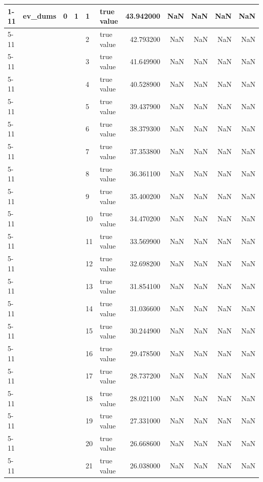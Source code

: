 \begin{tabular}{llllllrrrrr}
\cline{1-11} \cline{2-11} \cline{3-11} \cline{4-11} \cline{5-11}
\multirow[t]{202}{*}{ev} & \multirow[t]{202}{*}{ev_dums} & \multirow[t]{101}{*}{0} & \multirow[t]{25}{*}{1} & 1 & true value & 43.942000 & NaN & NaN & NaN & NaN \\
\cline{5-11}
 &  &  &  & 2 & true value & 42.793200 & NaN & NaN & NaN & NaN \\
\cline{5-11}
 &  &  &  & 3 & true value & 41.649900 & NaN & NaN & NaN & NaN \\
\cline{5-11}
 &  &  &  & 4 & true value & 40.528900 & NaN & NaN & NaN & NaN \\
\cline{5-11}
 &  &  &  & 5 & true value & 39.437900 & NaN & NaN & NaN & NaN \\
\cline{5-11}
 &  &  &  & 6 & true value & 38.379300 & NaN & NaN & NaN & NaN \\
\cline{5-11}
 &  &  &  & 7 & true value & 37.353800 & NaN & NaN & NaN & NaN \\
\cline{5-11}
 &  &  &  & 8 & true value & 36.361100 & NaN & NaN & NaN & NaN \\
\cline{5-11}
 &  &  &  & 9 & true value & 35.400200 & NaN & NaN & NaN & NaN \\
\cline{5-11}
 &  &  &  & 10 & true value & 34.470200 & NaN & NaN & NaN & NaN \\
\cline{5-11}
 &  &  &  & 11 & true value & 33.569900 & NaN & NaN & NaN & NaN \\
\cline{5-11}
 &  &  &  & 12 & true value & 32.698200 & NaN & NaN & NaN & NaN \\
\cline{5-11}
 &  &  &  & 13 & true value & 31.854100 & NaN & NaN & NaN & NaN \\
\cline{5-11}
 &  &  &  & 14 & true value & 31.036600 & NaN & NaN & NaN & NaN \\
\cline{5-11}
 &  &  &  & 15 & true value & 30.244900 & NaN & NaN & NaN & NaN \\
\cline{5-11}
 &  &  &  & 16 & true value & 29.478500 & NaN & NaN & NaN & NaN \\
\cline{5-11}
 &  &  &  & 17 & true value & 28.737200 & NaN & NaN & NaN & NaN \\
\cline{5-11}
 &  &  &  & 18 & true value & 28.021100 & NaN & NaN & NaN & NaN \\
\cline{5-11}
 &  &  &  & 19 & true value & 27.331000 & NaN & NaN & NaN & NaN \\
\cline{5-11}
 &  &  &  & 20 & true value & 26.668600 & NaN & NaN & NaN & NaN \\
\cline{5-11}
 &  &  &  & 21 & true value & 26.038000 & NaN & NaN & NaN & NaN \\

\end{tabular}
